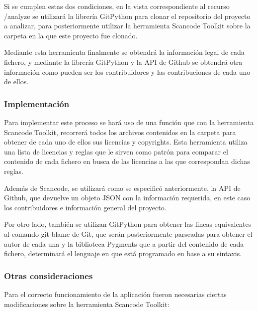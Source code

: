 \documentclass[a4paper, spanish, 12pt]{book}
\begin{document}
Si se cumplen estas dos condiciones, en la vista correspondiente al recurso /analyze
se utilizar\'a la librer\'ia GitPython para clonar el repositorio del proyecto
a analizar, para posteriormente utilizar la herramienta Scancode Toolkit sobre la
carpeta en la que este proyecto fue clonado.

Mediante esta herramienta finalmente se obtendr\'a la informaci\'on legal de cada
fichero, y mediante la librer\'ia GitPython y la API de Github se obtendr\'a otra informaci\'on como
pueden ser los contribuidores y las contribuciones de cada uno de ellos.

\subsubsection*{Implementaci\'on}
\label{subsubsec:implementacion}

Para implementar este proceso se har\'a uso de una funci\'on que con la herramienta
Scancode Toolkit, recorrer\'a todos los archivos contenidos en la carpeta para
obtener de cada uno de ellos sus licencias y copyrights. Esta herramienta utiliza
una lista de licencias y reglas que le sirven como patr\'on para comparar el
contenido de cada fichero en busca de las licencias a las que correspondan dichas reglas.

Adem\'as de Scancode, se utilizar\'a como se especific\'o anteriormente, la API de
Github, que devuelve un objeto JSON con la informaci\'on requerida, en este caso
los contribuidores e informaci\'on general del proyecto.

Por otro lado, tambi\'en se utilizan GitPython para obtener las lineas equivalentes al comando git blame de Git,
que ser\'an posteriormente parseadas para obtener el autor de cada una y la biblioteca
Pygments que a partir del contenido de cada fichero, determinar\'a el lenguaje en
que est\'a programado en base a su sintaxis.

\subsubsection*{Otras consideraciones}
\label{subsubsec:consideraciones}

Para el correcto funcionamiento de la aplicaci\'on fueron necesarias ciertas modificaciones
sobre la herramienta Scancode Toolkit:
\end{document}
